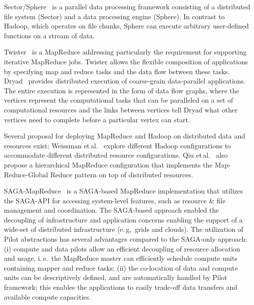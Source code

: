 \documentclass{sig-alternate}
\newcommand{\pnote}[1]{ {\textcolor{magenta} { ***pradeep: #1 }}}
\newcommand{\thirdrev}[1]{ {\textcolor{Bittersweet} { ***reviewer3: #1 }}}
\newcommand{\pnote}[1]{}
\begin{document}

Sector/Sphere~\cite{Gu_Grossman_2009} is a parallel data processing
framework consisting of a distributed file system (Sector) and a data
processing engine (Sphere). In contrast to Hadoop, which operates on
file chunks, Sphere can execute arbitrary user-defined functions on a
stream of data.

Twister~\cite{Ekanayake:2010:TRI:1851476.1851593} is a 
MapReduce addressing particularly the requirement for supporting iterative 
MapReduce jobs. Twister allows the flexible composition of applications by 
specifying map and reduce tasks and the data flow between these tasks. 
Dryad~\cite{Isard:2007:DDD:1272998.1273005} provides distributed execution of
coarse-grain data-parallel applications. The entire execution is represented in
the form of data flow graphs, where the vertices represent the computational
tasks that can be paralleled on a set of computational resources and the links
between vertices tell Dryad what other vertices need to complete before a
particular vertex can start.

Several proposal for deploying MapReduce and Hadoop on distributed data and
resources exist: Weissman et\,al.~\cite{weissman-mr-11} explore different Hadoop
configurations to accommodate different distributed resource configurations. 
Qiu et\,al.~\cite{ecmls11-mr-autodock} also propose a hierarchical
MapReduce configuration that implements the Map-Reduce-Global Reduce pattern on 
top of distributed resources. 

SAGA-MapReduce~\cite{Sehgal:2011:UAI:1945091.1945329} is a SAGA-based
MapReduce implementation that utilizes the SAGA-API for accessing
system-level features, such as resource \& file management and
coordination. The SAGA-based approach enabled the decoupling of
infrastructure and application concerns enabling the support of a
wide-set of distributed infrastructure (e.\,g,\ grids and clouds). The
utilization of Pilot abstractions has several advantages compared to
the SAGA-only approach: (i) compute and data pilots allow an efficient
decoupling of resource allocation and usage, i.\,e.\ the MapReduce
master can efficiently schedule compute units containing mapper and
reduce tasks; (ii) the co-location of data and compute units can be
descriptively defined, and are automatically handled by Pilot
framework; this enables the applications to easily trade-off data
transfers and available compute capacities.
\end{document}
